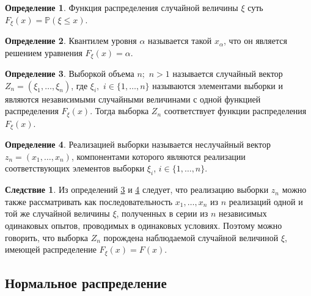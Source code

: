\documentclass[12pt]{article}
\theoremstyle{definition}
\newtheorem{definition}{Определение}
\newtheorem{consequence}{Следствие}[subsection]
\newcommand{\prob}{\mathbb{P}}
\begin{document}
\begin{definition}
    Функция распределения случайной величины $\xi$ суть $F_\xi(x)=\prob(\xi\leq x)$.
\end{definition}
\begin{definition}
    Квантилем уровня $\alpha$ называется такой $x_\alpha$, что он является решением уравнения $F_\xi(x)=\alpha$.
\end{definition}
\begin{definition}\label{выборка}
    Выборкой объема $n;\,\,n>1$ называется случайный вектор $Z_n=(\xi_1,\ldots,\xi_n)$, где $\xi_i,\,\,i\in\{1,\ldots,n\}$ называются элементами выборки и являются независимыми случайными величинами с одной функцией распределения $F_\xi(x)$. Тогда выборка $Z_n$ соответствует функции распределения $F_\xi(x)$.
\end{definition}
\begin{definition}\label{реализация выборки}
    Реализацией выборки называется неслучайный вектор $z_n=(x_1,\ldots,x_n)$, компонентами которого являются реализации соответствующих элементов выборки $\xi_i$, $i\in\{1,\ldots,n\}$.
\end{definition}
\begin{consequence}
    Из определений \ref{выборка} и \ref{реализация выборки} следует, что реализацию выборки $z_n$ можно также рассматривать как последовательность $x_1,\ldots,x_n$ из $n$ реализаций одной и той же случайной величины $\xi$, полученных в серии из $n$ независимых одинаковых опытов, проводимых в одинаковых условиях. Поэтому можно говорить, что выборка $Z_n$ порождена наблюдаемой случайной величиной $\xi$, имеющей распределение $F_\xi(x)=F(x)$.
\end{consequence}

\subsection{Нормальное распределение}
\end{document}
